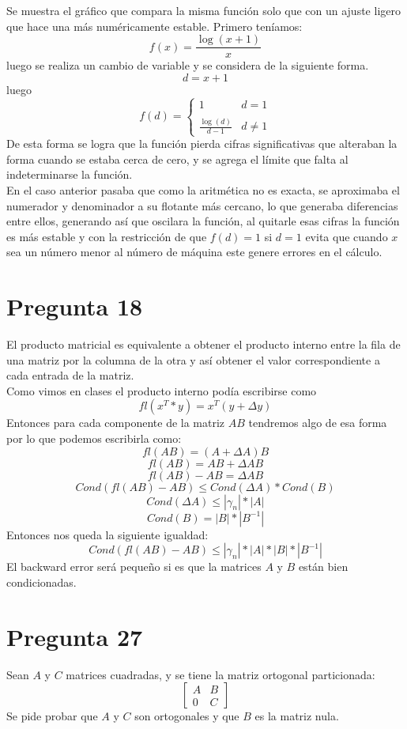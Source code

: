 \documentclass{article}
\begin{document}
\pagebreak
Se muestra el gráfico que compara la misma función solo que con un ajuste ligero que hace una más numéricamente estable. Primero teníamos:
$$f(x) = \frac{\log(x+1)}{x}$$
luego se realiza un cambio de variable y se considera de la siguiente forma.
$$d = x+1 $$
luego 
$$f(d) = \left\lbrace\begin{matrix}
1 &   d = 1\\
\\
\frac{\log(d)}{d-1}&d\neq 1
\end{matrix}\right.$$
De esta forma se logra que la función pierda cifras significativas que alteraban la forma cuando se estaba cerca de cero, y se agrega el límite que falta al indeterminarse la función.\\

En el caso anterior pasaba que como la aritmética no es exacta, se aproximaba el numerador y denominador a su flotante más cercano, lo que generaba diferencias entre ellos, generando así que oscilara la función, al quitarle esas cifras la función es más estable y con la restricción de que $f(d) = 1$ si $d =1$ evita que cuando $x$ sea un número menor al número de máquina este genere errores en el cálculo.
\section*{Pregunta 18}
El producto matricial es equivalente a obtener el producto interno entre la fila de una matriz por la columna de la otra y así obtener el valor correspondiente a cada entrada de la matriz.\\
Como vimos en clases el producto interno podía escribirse como 
$$fl(x^{T}*y)= x^{T}(y+\Delta y)$$
Entonces para cada componente de la matriz $AB$ tendremos algo de esa forma 
por lo que podemos escribirla como:
$$ fl(AB) = (A + \Delta A) B$$
$$ fl (AB) = AB + \Delta AB$$
$$fl(AB)-AB=\Delta AB$$
$$Cond(fl(AB)-AB) \leq Cond(\Delta A)*Cond(B)$$
$$Cond(\Delta A) \leq |\gamma_n|*|A|$$
$$Cond(B)= |B|*|B^{-1}|$$
Entonces nos queda la siguiente igualdad:
$$Cond(fl(AB)-AB)\leq |\gamma_n|*|A|*|B|*|B^{-1}|  $$
El backward error será pequeño si es que la matrices $A$ y $B$ están bien condicionadas.
\section*{Pregunta 27}
Sean $A$ y $C$ matrices cuadradas, y se tiene la matriz ortogonal particionada:
$$
\begin{bmatrix}
A&B\\
0&C
\end{bmatrix}
$$
Se pide probar que $A$ y $C$ son ortogonales y que $B$ es la matriz nula.\\
\end{document}
